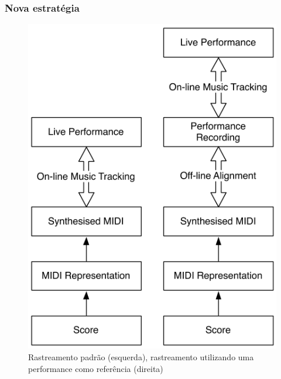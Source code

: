 \begin{frame}[label=figura1]
  \frametitle{Nova estratégia}
  \begin{figure}[!ht]
    \centering
    \includegraphics[height=0.7\textheight]{src/img/2-Figure1-1.png}
    \caption*{Rastreamento padrão (esquerda), rastreamento utilizando uma performance como referência (direita)}
  \end{figure}
\end{frame}
